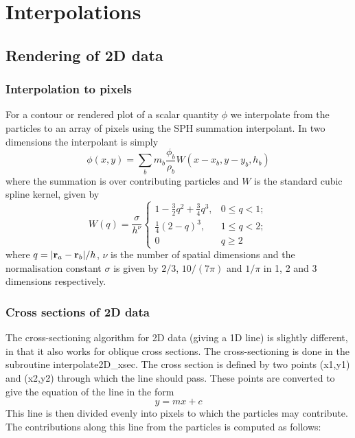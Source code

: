 \documentclass[a4paper,12pt]{article}
\begin{document}
\section{Interpolations}

\subsection{Rendering of 2D data}
\subsubsection{Interpolation to pixels}
 For a contour or rendered plot of a scalar quantity $\phi$ we
interpolate from the particles to an array of pixels using the SPH summation
interpolant. In two dimensions the interpolant is simply
\begin{equation}
\phi(x,y) = \sum_b m_b \frac{\phi_b}{\rho_b} W(x - x_b, y-y_b, h_b)
\end{equation}
where the summation is over contributing particles and $W$ is the standard cubic spline kernel, given by
\begin{equation}
W(q) = \frac{\sigma}{h^\nu}\left\{ \begin{array}{ll}
1 - \frac{3}{2}q^2 + \frac{3}{4}q^3, & 0 \le q < 1; \\
\frac{1}{4}(2-q)^3, & 1 \le q < 2; \\
0 & q \ge 2 \end{array} \right.
\end{equation}
where $q = \vert {\bf r}_a - {\bf r}_b \vert / h$, $\nu$ is the number of spatial
dimensions and the normalisation constant $\sigma$ is given by $2/3$, $10/(7\pi)$ and $1/\pi$ in
1, 2 and 3 dimensions respectively.

\subsubsection{Cross sections of 2D data}
The cross-sectioning algorithm for 2D data (giving a 1D line) is slightly
different, in that it also works for oblique cross sections. The
cross-sectioning is done in the subroutine interpolate2D\_xsec. The cross
section is defined by two points (x1,y1) and (x2,y2) through which the line
should pass. These points are converted to give the equation of the line in the
form
\begin{equation}
y = mx + c
\end{equation}
This line is then divided evenly into pixels to which the particles
may contribute. The contributions along this line from the particles is computed
as follows: 
\end{document}
